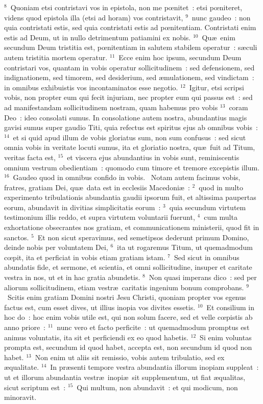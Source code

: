 ${}^{8}$~Quoniam etsi contristavi vos in epistola, non me pœnitet~: etsi pœniteret, videns quod epistola illa (etsi ad horam) vos contristavit,
${}^{9}$~nunc gaudeo~: non quia contristati estis, sed quia contristati estis ad pœnitentiam. Contristati enim estis ad Deum, ut in nullo detrimentum patiamini ex nobis.
${}^{10}$~Qu\ae\ enim secundum Deum tristitia est, pœnitentiam in salutem stabilem operatur~: s\ae culi autem tristitia mortem operatur.
${}^{11}$~Ecce enim hoc ipsum, secundum Deum contristari vos, quantam in vobis operatur sollicitudinem~: sed defensionem, sed indignationem, sed timorem, sed desiderium, sed \ae mulationem, sed vindictam~: in omnibus exhibuistis vos incontaminatos esse negotio.
${}^{12}$~Igitur, etsi scripsi vobis, non propter eum qui fecit injuriam, nec propter eum qui passus est~: sed ad manifestandam sollicitudinem nostram, quam habemus pro vobis
${}^{13}$~coram Deo~: ideo consolati sumus. In consolatione autem nostra, abundantius magis gavisi sumus super gaudio Titi, quia refectus est spiritus ejus ab omnibus vobis~:
${}^{14}$~et si quid apud illum de vobis gloriatus sum, non sum confusus~: sed sicut omnia vobis in veritate locuti sumus, ita et gloriatio nostra, qu\ae\ fuit ad Titum, veritas facta est,
${}^{15}$~et viscera ejus abundantius in vobis sunt, reminiscentis omnium vestrum obedientiam~: quomodo cum timore et tremore excepistis illum.
${}^{16}$~Gaudeo quod in omnibus confido in vobis.
~\lettrine[lines=10,image=true,loversize=0.05,lraise=-0.03]{N}{}otam autem facimus vobis, fratres, gratiam Dei, qu\ae\ data est in ecclesiis Macedoni\ae~:
${}^{2}$~quod in multo experimento tribulationis abundantia gaudii ipsorum fuit, et altissima paupertas eorum, abundavit in divitias simplicitatis eorum~:
${}^{3}$~quia secundum virtutem testimonium illis reddo, et supra virtutem voluntarii fuerunt,
${}^{4}$~cum multa exhortatione obsecrantes nos gratiam, et communicationem ministerii, quod fit in sanctos.
${}^{5}$~Et non sicut speravimus, sed semetipsos dederunt primum Domino, deinde nobis per voluntatem Dei,
${}^{6}$~ita ut rogaremus Titum, ut quemadmodum cœpit, ita et perficiat in vobis etiam gratiam istam.
${}^{7}$~Sed sicut in omnibus abundatis fide, et sermone, et scientia, et omni sollicitudine, insuper et caritate vestra in nos, ut et in hac gratia abundetis.
${}^{8}$~Non quasi imperans dico~: sed per aliorum sollicitudinem, etiam vestr\ae\ caritatis ingenium bonum comprobans.
${}^{9}$~Scitis enim gratiam Domini nostri Jesu Christi, quoniam propter vos egenus factus est, cum esset dives, ut illius inopia vos divites essetis.
${}^{10}$~Et consilium in hoc do~: hoc enim vobis utile est, qui non solum facere, sed et velle cœpistis ab anno priore~:
${}^{11}$~nunc vero et facto perficite~: ut quemadmodum promptus est animus voluntatis, ita sit et perficiendi ex eo quod habetis.
${}^{12}$~Si enim voluntas prompta est, secundum id quod habet, accepta est, non secundum id quod non habet.
${}^{13}$~Non enim ut aliis sit remissio, vobis autem tribulatio, sed ex \ae qualitate.
${}^{14}$~In pr\ae senti tempore vestra abundantia illorum inopiam suppleat~: ut et illorum abundantia vestr\ae\ inopi\ae\ sit supplementum, ut fiat \ae qualitas, sicut scriptum est~:
${}^{15}$~Qui multum, non abundavit~: et qui modicum, non minoravit.


